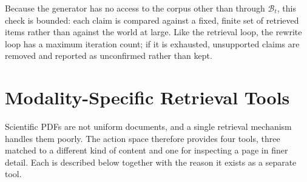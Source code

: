 Because the generator has no access to the corpus other than through
$\mathcal{B}_t$, this check is bounded: each claim is compared against a fixed,
finite set of retrieved items rather than against the world at large. Like the
retrieval loop, the rewrite loop has a maximum iteration count; if it is exhausted,
unsupported claims are removed and reported as unconfirmed rather than kept.

\section{Modality-Specific Retrieval Tools}

Scientific PDFs are not uniform documents, and a single retrieval mechanism handles
them poorly. The action space therefore provides four tools, three matched to a
different kind of content and one for inspecting a page in finer detail. Each is described below together with the reason it
exists as a separate tool.

